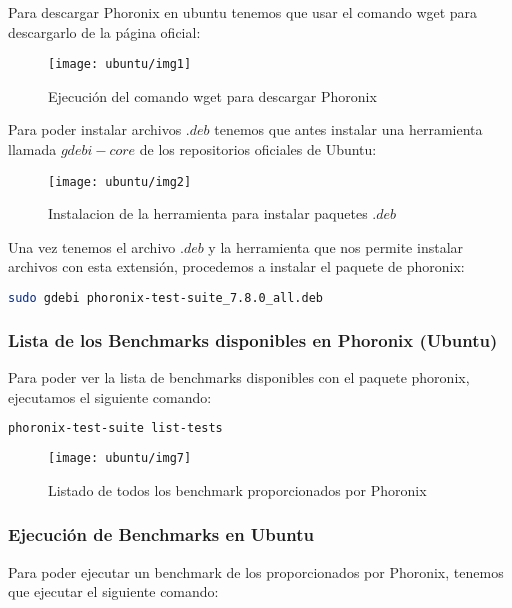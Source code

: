 Para descargar Phoronix en ubuntu tenemos que usar el comando wget para descargarlo de la página oficial:

\begin{figure}[H]
    \centering
    \texttt{[image: ubuntu/img1]}
    \caption{Ejecución del comando wget para descargar Phoronix}
\end{figure}

Para poder instalar archivos $.deb$ tenemos que antes instalar una herramienta llamada $gdebi-core$ de los repositorios oficiales de Ubuntu:

\begin{figure}[H]
    \centering
    \texttt{[image: ubuntu/img2]}
    \caption{Instalacion de la herramienta para instalar paquetes $.deb$}
\end{figure}

Una vez tenemos el archivo $.deb$ y la herramienta que nos permite instalar archivos con esta extensión, procedemos a instalar el paquete de phoronix:

\begin{lstlisting}[language=bash]
    sudo gdebi phoronix-test-suite_7.8.0_all.deb 
\end{lstlisting}

\subsubsection{Lista de los Benchmarks disponibles en Phoronix (Ubuntu)}

Para poder ver la lista de benchmarks disponibles con el paquete phoronix, ejecutamos el siguiente comando:

\begin{lstlisting}[language=bash]
    phoronix-test-suite list-tests
\end{lstlisting}

\begin{figure}[H]
    \centering
    \texttt{[image: ubuntu/img7]}
    \caption{Listado de todos los benchmark proporcionados por Phoronix}
\end{figure}

\newpage
\subsubsection{Ejecución de Benchmarks en Ubuntu}

Para poder ejecutar un benchmark de los proporcionados por Phoronix, tenemos que ejecutar el siguiente comando:


